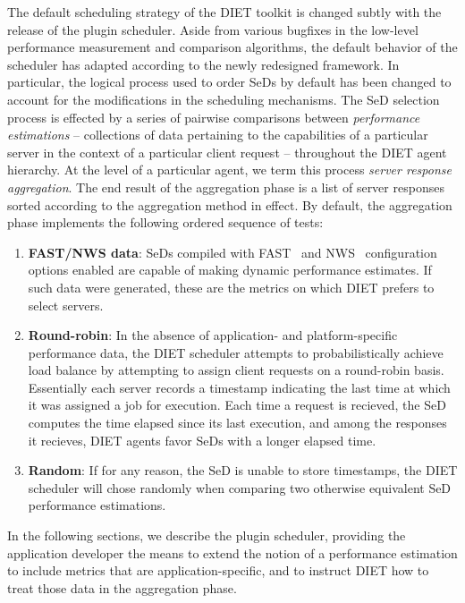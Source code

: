 The default scheduling strategy of the DIET toolkit is changed subtly
with the release of the plugin scheduler.  Aside from various bugfixes
in the low-level
performance measurement and comparison algorithms, the default
behavior of the scheduler has adapted according to the newly
redesigned framework.  In particular, the logical process used to
order SeDs by default has been changed to account for the
modifications in
the scheduling mechanisms.  The SeD selection process is effected by a
series of pairwise comparisons between
\emph{performance estimations} -- collections of data pertaining to
the capabilities of a particular server in the context of a particular
client request -- throughout the DIET agent hierarchy.  At the level
of a particular agent, we term this process
\emph{server response aggregation}.  The end result of the aggregation
phase is a list of server responses sorted according to the
aggregation method in effect.
By default, the aggregation phase
implements the following ordered sequence of tests:

\begin{enumerate}
\item \textbf{FAST/NWS data}: SeDs compiled with FAST~\cite{Qui02} and
  NWS~\cite{WSH99}
  configuration options enabled are capable of making dynamic
  performance estimates.  If such data
  were generated, these are the metrics on which DIET prefers to
  select servers.
\item \textbf{Round-robin}: In the absence of application- and
  platform-specific performance
  data, the DIET scheduler attempts to probabilistically achieve load
  balance by attempting to assign client requests on a round-robin
  basis.  Essentially each server records a timestamp indicating the
  last time at which it was assigned a job for execution.  Each time a
  request is recieved, the SeD computes the time elapsed since its
  last execution, and among the responses it recieves, DIET agents
  favor SeDs with a longer elapsed time.
\item \textbf{Random}: If for any reason, the SeD is unable to store
  timestamps, the DIET scheduler will chose randomly when
  comparing two otherwise equivalent SeD performance estimations.
\end{enumerate}

In the following sections, we describe the plugin scheduler, providing
the application developer the means to extend the notion of a
performance estimation to include metrics that are
application-specific, and to instruct DIET how to treat those data in
the aggregation phase.


